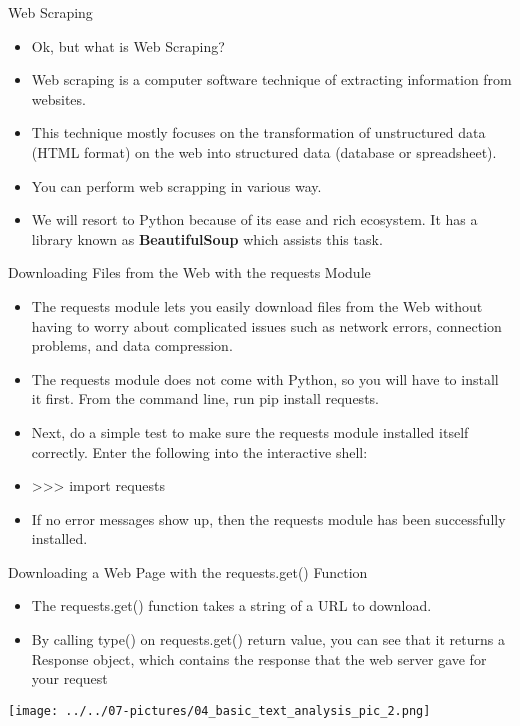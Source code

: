 \documentclass[11pt]{beamer}
\begin{document}
\begin{frame}{Web Scraping}
	\begin{itemize}
		\item Ok, but what is Web Scraping?
		\item Web scraping is a computer software technique of extracting information from websites. 
		\item This technique mostly focuses on the transformation of unstructured data (HTML format) on the web into structured data (database or spreadsheet).
		\item You can perform web scrapping in various way.
		\item We will resort to Python because of its ease and rich ecosystem. It has a library known as \textbf{BeautifulSoup} which assists this task. 
	\end{itemize}
\end{frame}
\begin{frame}{Downloading Files from the Web with the requests Module}
	\begin{itemize}
		\item The requests module lets you easily download files from the Web without having to worry about complicated issues such as network errors, connection problems, and data compression. 
		\item The requests module does not come with Python, so you will have to install it first. From the command line, run pip install requests. 
		\item Next, do a simple test to make sure the requests module installed itself correctly. Enter the following into the interactive shell:
		\item >>> import requests
		\item If no error messages show up, then the requests module has been successfully installed.
	\end{itemize}
\end{frame}
\begin{frame}{Downloading a Web Page with the requests.get() Function}
	\begin{itemize}
		\item The requests.get() function takes a string of a URL to download. 
		\item By calling type() on requests.get() return value, you can see that it returns a Response object, which contains the response that the web server gave for your request
	\end{itemize}
	\begin{center}
	\texttt{[image: ../../07-pictures/04\_basic\_text\_analysis\_pic\_2.png]}
	\end{center}
\end{frame}
\end{document}
